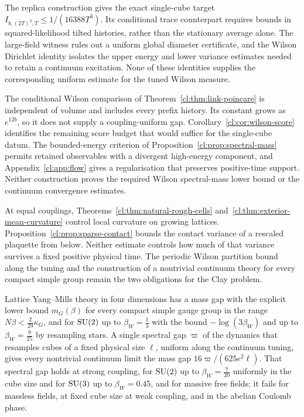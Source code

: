 The replica construction gives the exact single-cube target
$I_{b,(2T)^3,T}\le1/(16388T^3)$. Its conditional trace counterpart
requires bounds in squared-likelihood tilted histories, rather than the
stationary average alone. The large-field witness rules out a uniform
global diameter certificate, and the Wilson Dirichlet identity isolates
the upper energy and lower variance estimates needed to retain a
continuum excitation. None of these identities supplies the corresponding
uniform estimate for the tuned Wilson measure.


The conditional Wilson comparison of Theorem~\ref{cl:thm:link-poincare}
is independent of volume and includes every prefix history. Its constant
grows as $e^{12b}$, so it does not supply a coupling-uniform gap.
Corollary~\ref{cl:cor:wilson-score} identifies the remaining score budget
that would suffice for the single-cube datum. The bounded-energy
criterion of Proposition~\ref{cl:prop:spectral-mass} permits retained
observables with a divergent high-energy component, and
Appendix~\ref{cl:app:flow} gives a regularisation that preserves
positive-time support. Neither construction proves the required
Wilson spectral-mass lower bound or the continuum convergence estimates.

At equal couplings, Theorems~\ref{cl:thm:natural-rough-cells}
and~\ref{cl:thm:exterior-mean-curvature} control local curvature on
growing lattices. Proposition~\ref{cl:prop:sparse-contact} bounds the
contact variance of a rescaled plaquette from below. Neither estimate
controls how much of that variance survives a fixed positive physical
time. The periodic Wilson partition bound along the tuning and the
construction of a nontrivial continuum theory for every compact simple
group remain the two obligations for the Clay problem.



Lattice Yang--Mills theory in four dimensions has a mass gap with the explicit
lower bound $m_G(\beta)$ for every compact simple gauge group in the range
$N\beta<\frac2{29}\kappa_G$, and for $\mathrm{SU}(2)$ up to $\beta_W=\frac13$ with
the bound $-\log(3\beta_W)$ and up to $\beta_W=\frac9{25}$ by resampling stars. A
single
spectral gap $\varpi$ of the dynamics that resamples cubes of a fixed physical
size $\ell$, uniform along the continuum tuning, gives every nontrivial
continuum limit the mass gap $16\varpi/(625e^2\ell)$. That spectral gap holds
at strong coupling, for $\mathrm{SU}(2)$ up to $\beta_W=\frac7{20}$ uniformly in the
cube size and for $\mathrm{SU}(3)$ up to $\beta_W=0.45$, and for massive free fields;
it fails for massless fields, at fixed cube size at weak coupling, and in the
abelian Coulomb phase.


